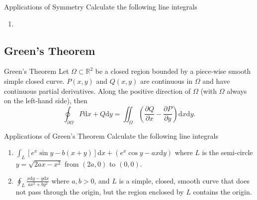 \begin{example}{Applications of Symmetry}{}
  Calculate the following line integrals
  \begin{enumerate}
  \item 
  \end{enumerate}
\end{example}

\subsection{Green's Theorem}

\begin{theorem}{Green's Theorem}{}
  Let $\Omega \subset \mathbb{R}^2$ be a closed region bounded by a piece-wise
  smooth simple closed curve.
  $P(x,y)$ and $Q(x,y)$ are continuous in $\Omega$ and have continuous partial derivatives.
  Along the positive direction of $\Omega$ (with $\Omega$ always on the
  left-hand side), then
  \begin{equation}
    \oint_{\partial \Omega} P \mathrm{d} x + Q \mathrm{d} y
    = \iint_{\Omega} \left( \frac{\partial Q}{\partial x} - \frac{\partial P}{\partial y} \right) \mathrm{d} x \mathrm{d}y.
  \end{equation}
\end{theorem}

\begin{example}{Applications of Green's Theorem}{}
  Calculate the following line integrals
  \begin{enumerate}
  \item $\int_L [e^x \sin y - b(x+y)]\mathrm{d} x + (e^x\cos y - ax\mathrm{d}
    y)$ where $L$ is the semi-circle $y = \sqrt{2ax - x^2}$ from $(2a, 0)$ to
    $(0, 0)$.
  \item $\oint_L \frac{x \mathrm{d} y - y \mathrm{d} x}{ax^2 + by^2}$ where
    $a, b> 0$, and
    $L$ is a simple, closed, smooth curve that does not pass through the origin,
    but the region enclosed by $L$ contains the origin.
  \end{enumerate}
\end{example}


